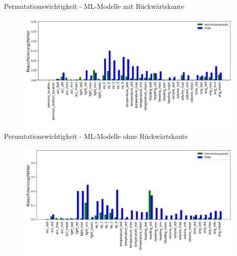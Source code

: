 \documentclass[10pt]{beamer}
\begin{document}
\begin{frame}{Permutationswichtigkeit - ML-Modelle mit Rückwärtskante}
    \begin{figure}
        \centering
        \includegraphics[width=\linewidth]{location_recognition/fi_consolidated.png}
    \end{figure}
\end{frame}

\begin{frame}{Permutationswichtigkeit - ML-Modelle ohne Rückwärtskante}
    \begin{figure}
        \centering
        \includegraphics[width=\linewidth]{location_recognition/fi_consolidated_wo_fb.png}
    \end{figure}
\end{frame}
\end{document}
